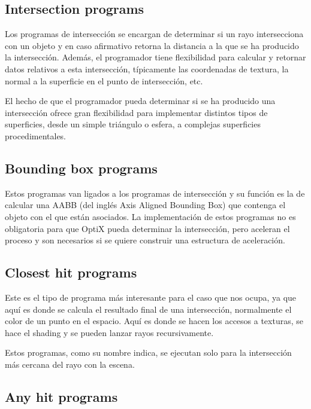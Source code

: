 \subsection{Intersection programs}

Los programas de intersección se encargan de determinar si un rayo intersecciona con un objeto y en caso afirmativo retorna la distancia a la que se ha producido la intersección. Además, el programador tiene flexibilidad para calcular y retornar datos relativos a esta intersección, típicamente las coordenadas de textura, la normal a la superficie en el punto de intersección, etc.

\medskip

El hecho de que el programador pueda determinar si se ha producido una intersección ofrece gran flexibilidad para implementar distintos tipos de superficies, desde un simple triángulo o esfera, a complejas superficies procedimentales.

\subsection{Bounding box programs}

Estos programas van ligados a los programas de intersección y su función es la de calcular una AABB (del inglés Axis Aligned Bounding Box) que contenga el objeto con el que están asociados. La implementación de estos programas no es obligatoria para que OptiX pueda determinar la intersección, pero aceleran el proceso y son necesarios si se quiere construir una estructura de aceleración.

\subsection{Closest hit programs}

Este es el tipo de programa más interesante para el caso que nos ocupa, ya que aquí es donde se calcula el resultado final de una intersección, normalmente el color de un punto en el espacio. Aquí es donde se hacen los accesos a texturas, se hace el shading y se pueden lanzar rayos recursivamente.

\medskip

Estos programas, como su nombre indica, se ejecutan solo para la intersección más cercana del rayo con la escena.

\subsection{Any hit programs}

